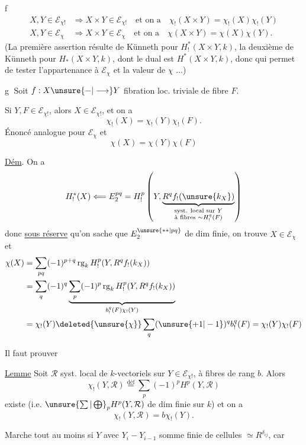 \textcircled{f}
\[
\begin{aligned}
X,Y\in\mathcal{E}_{\chi!}&\Longrightarrow X\times Y\in\mathcal{E}_{\chi!}\quad\text{et on a}\quad\chi_!(X\times Y)=\chi_!(X)\chi_!(Y)\\
X,Y\in\mathcal{E}_{\chi}&\Longrightarrow X\times Y\in\mathcal{E}_{\chi}\quad\text{et on a}\quad\chi(X\times Y)=\chi(X)\chi(Y).
\end{aligned}
\]
(La première assertion résulte de Künneth pour $H^*_!(X\times Y,k)$, la deuxième de Künneth pour $H_*(X\times Y,k)$, dont le dual est $H^*(X\times Y,k)$, donc qui permet de tester l'appartenance à $\mathcal{E}_{\chi}$ et la valeur de $\chi$ ...)

\textcircled{g} Soit $f:X\unsure{-|\longrightarrow}Y$ fibration loc. triviale de fibre $F$.

Si $Y,F\in\mathcal{E}_{\chi!}$, alors $X\in\mathcal{E}_{\chi!}$, et on a
\[
\chi_!(X)=\chi_!(Y)\chi_!(F).
\]
Énoncé analogue pour $\mathcal{E}_{\chi}$ et 
\[
\chi(X)=\chi(Y)\chi(F)
\]

\uline{Dém}. On a
\[
H^*_!(X)\Longleftarrow E_2^{pq}=H^p_!\left(Y,\underbrace{R^q f_!(\unsure{k_X})}_{\substack{\text{syst. local sur }Y\\\text{à fibres }\sim H^q_!(F)}}\right)
\]
donc \uline{sous réserve} qu'on sache que $E_2^{\unsure{**|pq}}$ de dim finie, on trouve $X\in\mathcal{E}_{\chi}$ et
\[
\begin{aligned}
\chi(X)&=\sum_{pq}(-1)^{p+q}\operatorname{rg}_k H^p_!(Y,R^q f_!(k_X))\\
&=\sum_q(-1)^q\underbrace{\sum_p(-1)^p\operatorname{rg}_k H^p_!(Y,R^q f_!(k_X))}_{b^q_!(F)\chi_!(Y)}\\
&=\chi_!(Y)\deleted{\unsure{\chi}}\sum_q(\unsure{+1|-1})^q b^q_!(F)=\chi_!(Y)\chi_!(F)
\end{aligned}
\]

Il faut prouver

\uline{Lemme} Soit $\mathcal{R}$ syst. local de $k$-vectoriels sur  $Y\in\mathcal{E}_{\chi!}$, à fibres de rang  $b$. Alors
\[
\chi_!(Y,\mathcal{R})\overset{\mathrm{déf}}=\sum_p(-1)^p H^p(Y,\mathcal{R})
\]
existe (i.e. $\unsure{\sum|\bigoplus}_p H^p(Y,\mathcal{R})$ de dim finie sur $k$) et on a
\[
\chi_!(Y,\mathcal{R})=b\chi_!(Y).
\]

Marche tout au moins si $Y$   avec $Y_i-Y_{i-1}$ somme finie de cellules $\simeq R^{\delta_{ij}}$, car

